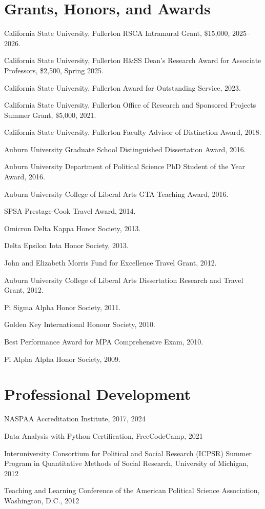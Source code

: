 \documentclass[11pt,letterpaper]{article}
\renewenvironment{itemize}{
  \begin{list}{}{
    \setlength{\leftmargin}{1.5em}
    \setlength{\itemsep}{0.25em}
    \setlength{\parskip}{0pt}
    \setlength{\parsep}{0.25em}
  }
}{
  \end{list}
}
\begin{document}
\section*{Grants, Honors, and Awards}
\begin{itemize}\leftmargin=2pt\itemindent=-15pt
  \item California State University, Fullerton RSCA Intramural Grant, \$15,000, 2025--2026.
  \item California State University, Fullerton H\&SS Dean's Research Award for Associate Professors, \$2,500, Spring 2025.
  \item California State University, Fullerton Award for Outstanding Service, 2023.
  \item California State University, Fullerton Office of Research and Sponsored Projects Summer Grant, \$5,000, 2021.
  \item California State University, Fullerton Faculty Advisor of Distinction Award, 2018.
  \item Auburn University Graduate School Distinguished Dissertation Award, 2016.
  \item Auburn University Department of Political Science PhD Student of the Year Award, 2016.
  \item Auburn University College of Liberal Arts GTA Teaching Award, 2016.
  \item SPSA Prestage-Cook Travel Award, 2014.
  \item Omicron Delta Kappa Honor Society, 2013.
  \item Delta Epsilon Iota Honor Society, 2013.
  \item John and Elizabeth Morris Fund for Excellence Travel Grant, 2012.
  \item Auburn University College of Liberal Arts Dissertation Research and Travel Grant, 2012.
  \item Pi Sigma Alpha Honor Society, 2011.
  \item Golden Key International Honour Society, 2010.
  \item Best Performance Award for MPA Comprehensive Exam, 2010.
  \item Pi Alpha Alpha Honor Society, 2009.
\end{itemize}

\section*{Professional Development}
\begin{itemize}\leftmargin=2pt\itemindent=-15pt
  \item NASPAA Accreditation Institute, 2017, 2024
  \item Data Analysis with Python Certification, FreeCodeCamp, 2021
  \item Interuniversity Consortium for Political and Social Research (ICPSR) Summer Program in Quantitative Methods of Social Research, University of Michigan, 2012
  \item Teaching and Learning Conference of the American Political Science Association, Washington, D.C., 2012
\end{itemize}
\end{document}
